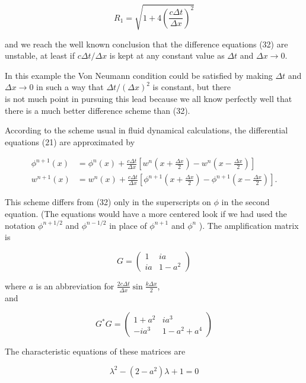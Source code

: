 \documentclass[10pt]{article}
\begin{document}
\[
R_{1}=\sqrt{1+4\left(\frac{c \Delta t}{\Delta x}\right)^{2}}
\]

and we reach the well known conclusion that the difference equations (32) are unstable, at least if \(c \Delta t / \Delta x\) is kept at any constant value as \(\Delta t\) and \(\Delta x \rightarrow 0\).

In this example the Von Neumann condition could be satisfied by making \(\Delta t\) and \(\Delta x \rightarrow 0\) in such a way that \(\Delta t /(\Delta x)^{2}\) is constant, but there\\
is not much point in pursuing this lead because we all know perfectly well that there is a much better difference scheme than (32).

According to the scheme usual in fluid dynamical calculations, the differential equations (21) are approximated by

\[
\begin{aligned}
\phi^{n+1}(x) & =\phi^{n}(x)+\frac{c \Delta t}{\Delta x}\left[w^{n}\left(x+\frac{\Delta x}{2}\right)-w^{n}\left(x-\frac{\Delta x}{2}\right)\right] \\
w^{n+1}(x) & =w^{n}(x)+\frac{c \Delta t}{\Delta x}\left[\phi^{n+1}\left(x+\frac{\Delta x}{2}\right)-\phi^{n+1}\left(x-\frac{\Delta x}{2}\right)\right] .
\end{aligned}
\]

This scheme differs from (32) only in the superscripts on \(\phi\) in the second equation. (The equations would have a more centered look if we had used the notation \(\phi^{n+1 / 2}\) and \(\phi^{n-1 / 2}\) in place of \(\phi^{n+1}\) and \(\phi^{n}\) ). The amplification matrix is

\[
G=\left(\begin{array}{lc}
1 & i a \\
i a & 1-a^{2}
\end{array}\right)
\]

where \(a\) is an abbreviation for \(\frac{2 c \Delta t}{\Delta x} \sin \frac{k \Delta x}{2}\),\\
and

\[
G^{*} G=\left(\begin{array}{ll}
1+a^{2} & i a^{3} \\
-i a^{3} & 1-a^{2}+a^{4}
\end{array}\right)
\]

The characteristic equations of these matrices are

\[
\lambda^{2}-\left(2-a^{2}\right) \lambda+1=0
\]
\end{document}
